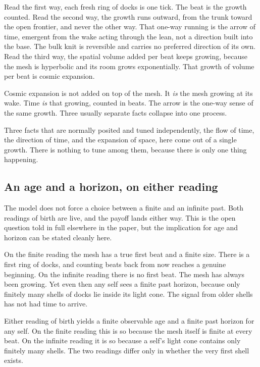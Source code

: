 Read the first way, each fresh ring of docks is one tick. The beat is the growth counted. Read the second way, the growth runs outward, from the trunk toward the open frontier, and never the other way. That one-way running is the arrow of time, emergent from the wake acting through the lean, not a direction built into the base. The bulk knit is reversible and carries no preferred direction of its own. Read the third way, the spatial volume added per beat keeps growing, because the mesh is hyperbolic and its room grows exponentially. That growth of volume per beat is cosmic expansion.

\begin{result}
Cosmic expansion is not added on top of the mesh. It \emph{is} the mesh growing at its wake. Time \emph{is} that growing, counted in beats. The arrow is the one-way sense of the same growth. Three usually separate facts collapse into one process.
\end{result}

Three facts that are normally posited and tuned independently, the flow of time, the direction of time, and the expansion of space, here come out of a single growth. There is nothing to tune among them, because there is only one thing happening.

\subsection{An age and a horizon, on either reading}

The model does not force a choice between a finite and an infinite past. Both readings of birth are live, and the payoff lands either way. This is the open question told in full elsewhere in the paper, but the implication for age and horizon can be stated cleanly here.

On the finite reading the mesh has a true first beat and a finite size. There is a first ring of docks, and counting beats back from now reaches a genuine beginning. On the infinite reading there is no first beat. The mesh has always been growing. Yet even then any self sees a finite past horizon, because only finitely many shells of docks lie inside its light cone. The signal from older shells has not had time to arrive.

\begin{proposition}
Either reading of birth yields a finite observable age and a finite past horizon for any self. On the finite reading this is so because the mesh itself is finite at every beat. On the infinite reading it is so because a self's light cone contains only finitely many shells. The two readings differ only in whether the very first shell exists.
\end{proposition}

